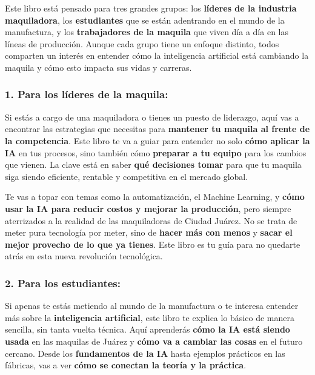 \documentclass[
  10pt,
  letterpaper,
]{book}
\begin{document}

Este libro está pensado para tres grandes grupos: los \textbf{líderes de
la industria maquiladora}, los \textbf{estudiantes} que se están
adentrando en el mundo de la manufactura, y los \textbf{trabajadores de
la maquila} que viven día a día en las líneas de producción. Aunque cada
grupo tiene un enfoque distinto, todos comparten un interés en entender
cómo la inteligencia artificial está cambiando la maquila y cómo esto
impacta sus vidas y carreras.

\subsubsection*{1. Para los líderes de la
maquila:}\label{para-los-luxedderes-de-la-maquila}

Si estás a cargo de una maquiladora o tienes un puesto de liderazgo,
aquí vas a encontrar las estrategias que necesitas para \textbf{mantener
tu maquila al frente de la competencia}. Este libro te va a guiar para
entender no solo \textbf{cómo aplicar la IA} en tus procesos, sino
también cómo \textbf{preparar a tu equipo} para los cambios que vienen.
La clave está en saber \textbf{qué decisiones tomar} para que tu maquila
siga siendo eficiente, rentable y competitiva en el mercado global.

Te vas a topar con temas como la automatización, el Machine Learning, y
\textbf{cómo usar la IA para reducir costos y mejorar la producción},
pero siempre aterrizados a la realidad de las maquiladoras de Ciudad
Juárez. No se trata de meter pura tecnología por meter, sino de
\textbf{hacer más con menos} y \textbf{sacar el mejor provecho de lo que
ya tienes}. Este libro es tu guía para no quedarte atrás en esta nueva
revolución tecnológica.

\subsubsection*{2. Para los estudiantes:}\label{para-los-estudiantes}

Si apenas te estás metiendo al mundo de la manufactura o te interesa
entender más sobre la \textbf{inteligencia artificial}, este libro te
explica lo básico de manera sencilla, sin tanta vuelta técnica. Aquí
aprenderás \textbf{cómo la IA está siendo usada} en las maquilas de
Juárez y \textbf{cómo va a cambiar las cosas} en el futuro cercano.
Desde los \textbf{fundamentos de la IA} hasta ejemplos prácticos en las
fábricas, vas a ver \textbf{cómo se conectan la teoría y la práctica}.
\end{document}

